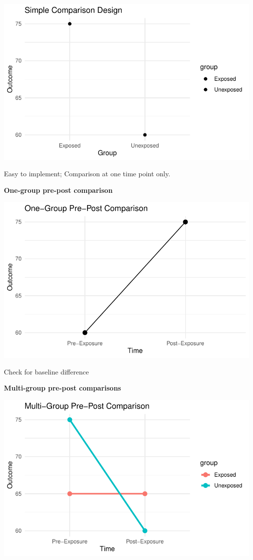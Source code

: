 \documentclass[
  letterpaper,
  DIV=11,
  numbers=noendperiod]{scrartcl}
\begin{document}
\includegraphics{lecture_hazardID_files/figure-pdf/unnamed-chunk-1-1.pdf}

Easy to implement; Comparison at one time point only.

\textbf{One-group pre-post comparison}

\includegraphics{lecture_hazardID_files/figure-pdf/unnamed-chunk-2-1.pdf}

Check for baseline difference

\textbf{Multi-group pre-post comparisons}

\includegraphics{lecture_hazardID_files/figure-pdf/unnamed-chunk-3-1.pdf}
\end{document}
